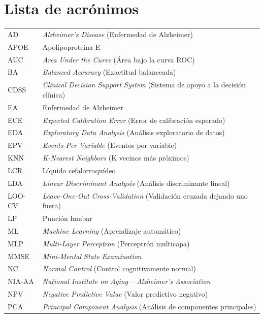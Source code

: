 \chapter*{Lista de acrónimos}

\begin{longtable}{@{}p{2cm}p{13cm}@{}}
AD      & \textit{Alzheimer's Disease} (Enfermedad de Alzheimer) \\[4pt]
APOE    & Apolipoproteína E \\[4pt]
AUC     & \textit{Area Under the Curve} (Área bajo la curva ROC) \\[4pt]
BA      & \textit{Balanced Accuracy} (Exactitud balanceada) \\[4pt]
CDSS    & \textit{Clinical Decision Support System} (Sistema de apoyo a la decisión clínica) \\[4pt]
EA      & Enfermedad de Alzheimer \\[4pt]
ECE     & \textit{Expected Calibration Error} (Error de calibración esperado) \\[4pt]
EDA     & \textit{Exploratory Data Analysis} (Análisis exploratorio de datos) \\[4pt]
EPV     & \textit{Events Per Variable} (Eventos por variable) \\[4pt]
KNN     & \textit{K-Nearest Neighbors} (K vecinos más próximos) \\[4pt]
LCR     & Líquido cefalorraquídeo \\[4pt]
LDA     & \textit{Linear Discriminant Analysis} (Análisis discriminante lineal) \\[4pt]
LOO-CV  & \textit{Leave-One-Out Cross-Validation} (Validación cruzada dejando uno fuera) \\[4pt]
LP      & Punción lumbar \\[4pt]
ML      & \textit{Machine Learning} (Aprendizaje automático) \\[4pt]
MLP     & \textit{Multi-Layer Perceptron} (Perceptrón multicapa) \\[4pt]
MMSE    & \textit{Mini-Mental State Examination} \\[4pt]
NC      & \textit{Normal Control} (Control cognitivamente normal) \\[4pt]
NIA-AA  & \textit{National Institute on Aging -- Alzheimer's Association} \\[4pt]
NPV     & \textit{Negative Predictive Value} (Valor predictivo negativo) \\[4pt]
PCA     & \textit{Principal Component Analysis} (Análisis de componentes principales) \\[4pt]

\end{longtable}
